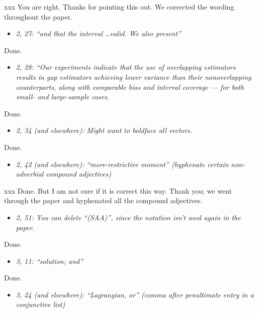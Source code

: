 \documentclass[11pt,notitlepage,onecolumn]{article}
\newcommand{\noi}{\noindent}
\begin{document}
\noi
xxx  You are right. 
Thanks for pointing this out. We corrected the wording throughout the paper. 
\medskip 


\begin{itemize}
\item[] \textit{2, 27: ``and that the interval \ldots valid. 
We also present''}
\end{itemize}

\noi
Done. 
\medskip 


\begin{itemize}
\item[] \textit{2, 28: ``Our experiments indicate that the use of overlapping estimators results in gap estimators achieving lower variance than their nonoverlapping counterparts, along with comparable bias and interval coverage --- for both small- and large-sample cases.}
\end{itemize}

\noi
Done.
\medskip 


\begin{itemize}
\item[] \textit{2, 34 (and elsewhere): Might want to boldface all vectors.}
\end{itemize}

\noi
Done.  
\medskip 


\begin{itemize}
\item[] \textit{2, 42 (and elsewhere): ``more-restrictive moment'' (hyphenate certain non-adverbial compound adjectives)}
\end{itemize}

\noi
xxx  Done. But I am not sure if it is correct this way.  
Thank you; we went through the paper and hyphenated all the compound adjectives.
\medskip 


\begin{itemize}
\item[] \textit{2, 51: You can delete ``(SAA)'', since the notation isn't used again in the paper.}
\end{itemize}

\noi
Done.  
\medskip 


\begin{itemize}
\item[] \textit{3, 11: ``solution; and''}
\end{itemize}

\noi
Done.
\medskip 


\begin{itemize}
\item[] \textit{3, 24 (and elsewhere): ``Lagrangian, or'' (comma after penultimate entry in a conjunctive list)}
\end{itemize}
\end{document}
